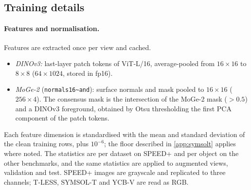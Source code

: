 \subsection{Training details}\label{app:training}

\paragraph{Features and normalisation.}
Features are extracted once per view and cached.
\begin{itemize}
  \item \emph{DINOv3:} last-layer patch tokens of ViT-L/16, average-pooled from $16\times16$ to $8\times8$ ($64\times1024$, stored in fp16).
  \item \emph{MoGe-2} (\texttt{normals16\textasciitilde and}): surface normals and mask pooled to $16\times16$ ($256\times4$). The consensus mask is the intersection of the MoGe-2 mask ($>0.5$) and a DINOv3 foreground, obtained by Otsu thresholding the first PCA component of the patch tokens.
\end{itemize}
Each feature dimension is standardised with the mean and standard deviation of the clean training rows, plus $10^{-6}$; the floor described in \cref{app:symsolt} applies where noted. The statistics are per dataset on SPEED+ and per object on the other benchmarks, and the same statistics are applied to augmented views, validation and test.
SPEED+ images are grayscale and replicated to three channels; T-LESS, SYMSOL-T and YCB-V are read as RGB.

